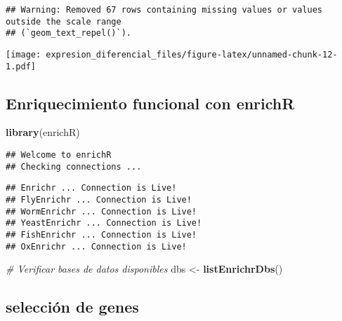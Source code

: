 \documentclass[
]{article}
\newenvironment{Shaded}{\begin{snugshade}}{\end{snugshade}}
\newcommand{\CommentTok}[1]{\textcolor[rgb]{0.56,0.35,0.01}{\textit{#1}}}
\newcommand{\FunctionTok}[1]{\textcolor[rgb]{0.13,0.29,0.53}{\textbf{#1}}}
\newcommand{\NormalTok}[1]{#1}
\newcommand{\OtherTok}[1]{\textcolor[rgb]{0.56,0.35,0.01}{#1}}
\begin{document}
\begin{verbatim}
## Warning: Removed 67 rows containing missing values or values outside the scale range
## (`geom_text_repel()`).
\end{verbatim}

\texttt{[image: expresion\_diferencial\_files/figure-latex/unnamed-chunk-12-1.pdf]}

\subsection{Enriquecimiento funcional con
enrichR}\label{enriquecimiento-funcional-con-enrichr}

\begin{Shaded}
\begin{Highlighting}[]
\FunctionTok{library}\NormalTok{(enrichR)}
\end{Highlighting}
\end{Shaded}

\begin{verbatim}
## Welcome to enrichR
## Checking connections ...
\end{verbatim}

\begin{verbatim}
## Enrichr ... Connection is Live!
## FlyEnrichr ... Connection is Live!
## WormEnrichr ... Connection is Live!
## YeastEnrichr ... Connection is Live!
## FishEnrichr ... Connection is Live!
## OxEnrichr ... Connection is Live!
\end{verbatim}

\begin{Shaded}
\begin{Highlighting}[]
\CommentTok{\# Verificar bases de datos disponibles}
\NormalTok{dbs }\OtherTok{\textless{}{-}} \FunctionTok{listEnrichrDbs}\NormalTok{()}
\end{Highlighting}
\end{Shaded}

\subsection{selección de genes}\label{selecciuxf3n-de-genes-1}
\end{document}
